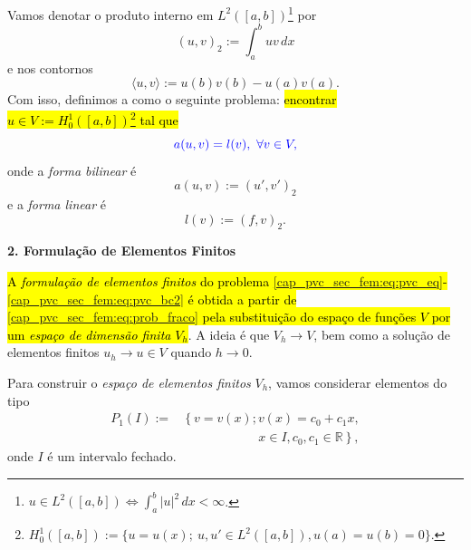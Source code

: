 Vamos denotar o produto interno em $L^2([a,b])$\footnote{$u\in L^2([a,b]) \Leftrightarrow \int_a^b |u|^2\,dx < \infty$.} por
\begin{equation}
  (u, v)_2 := \int_a^b uv\,dx
\end{equation}
e nos contornos
\begin{equation}
  \langle u, v \rangle := u(b)v(b) - u(a)v(a).
\end{equation}
Com isso, definimos a  como o seguinte problema: \hl{encontrar $u\in V := H_0^1([a,b])$\footnote{$H_0^1([a,b]) := \{u=u(x);~u,u'\in L^2([a,b]), u(a)=u(b)=0\}$.} tal que}
\begin{equation}\color{blue}\label{cap_pvc_sec_fem:eq:prob_fraco}
  a(u, v) = l(v), ~\forall v\in V,
\end{equation}
onde a \emph{forma bilinear} é
\begin{equation}
  a(u, v) := (u', v')_2
\end{equation}
e a \emph{forma linear} é
\begin{equation}
  l(v) := (f, v)_2.
\end{equation}

\begin{flushleft}
  \textbf{2. Formulação de Elementos Finitos}
\end{flushleft}

\hl{A \emph{formulação de elementos finitos} do problema {\eqref{cap_pvc_sec_fem:eq:pvc_eq}}-{\eqref{cap_pvc_sec_fem:eq:pvc_bc2}} é obtida a partir de {\eqref{cap_pvc_sec_fem:eq:prob_fraco}} pela substituição do espaço de funções $V$ por um \emph{espaço de dimensão finita} $V_h$}. A ideia é que $V_h\to V$, bem como a solução de elementos finitos $u_h\to u\in V$ quando $h\to 0$.

Para construir o \emph{espaço de elementos finitos} $V_h$, vamos considerar elementos do tipo
\begin{equation}
  \begin{aligned}
    P_1(I) := &\left\{v=v(x); v(x)=c_0+c_1x,\right. \\
    &\qquad\qquad\qquad\left. x\in I, c_0,c_1\in\mathbb{R}\right\},
  \end{aligned}
\end{equation}
onde $I$ é um intervalo fechado.

